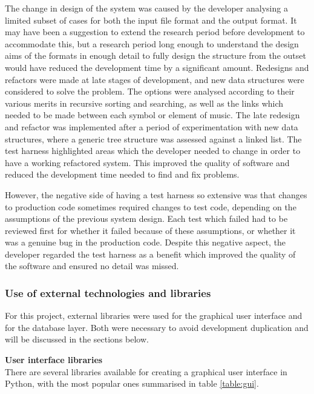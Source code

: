  The change in design of the system was caused by the developer analysing a limited subset of cases for both the input file format and the output format. It may have been a suggestion to extend the research period before development to accommodate this, but a research period long enough to understand the design aims of the formats in enough detail to fully design the structure from the outset would have reduced the development time by a significant amount. Redesigns and refactors were made at late stages of development, and new data structures were considered to solve the problem. The options were analysed according to their various merits in recursive sorting and searching, as well as the links which needed to be made between each symbol or element of music. The late redesign and refactor was implemented after a period of experimentation with new data structures, where a generic tree structure was assessed against a linked list. The test harness highlighted areas which the developer needed to change in order to have a working refactored system. This improved the quality of software and reduced the development time needed to find and fix problems.
 
 However, the negative side of having a test harness so extensive was that changes to production code sometimes required changes to test code, depending on the assumptions of the previous system design. Each test which failed had to be reviewed first for whether it failed because of these assumptions, or whether it was a genuine bug in the production code. Despite this negative aspect, the developer regarded the test harness as a benefit which improved the quality of the software and ensured no detail was missed. 
 
\subsubsection{Use of external technologies and libraries}
For this project, external libraries were used for the graphical user interface and for the database layer. Both were necessary to avoid development duplication and will be discussed in the sections below.

\textbf{User interface libraries} \\
There are several libraries available for creating a graphical user interface in Python, with the most popular ones summarised in table \ref{table:gui}.

